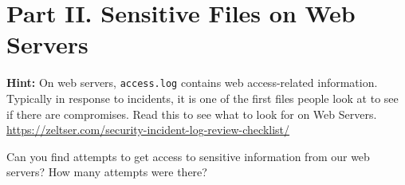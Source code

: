 \documentclass[a4paper, 10pt]{article}
\begin{document}
\newpage

\section*{\textbf{Part II.} Sensitive Files on Web Servers}

\noindent \textbf{Hint:} On web servers, \texttt{access.log} contains web access-related information.
Typically in response to incidents, it is one of the first files people look at to see if there are compromises.
Read this to see what to look for on Web Servers. \\
\href{https://zeltser.com/security-incident-log-review-checklist/}{https://zeltser.com/security-incident-log-review-checklist/}

\begin{problem}
Can you find attempts to get access to sensitive information from our web servers?
How many attempts were there?
\end{problem}
\end{document}
